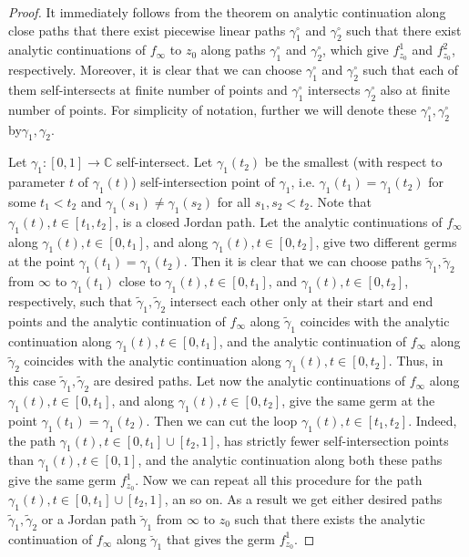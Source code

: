 \documentclass[12pt]{article}
\let\myt\widetilde
\def\CC{\mathbb C}
\begin{document}
\begin{proof}
It immediately follows from the theorem on analytic continuation along close paths that there exist piecewise linear paths $\gamma^\circ_1$ and $\gamma^\circ_2$ such that
there exist analytic continuations of $f_\infty$ to $z_0$ along paths $\gamma^\circ_1$ and $\gamma^\circ_2$, which give $f_{z_0}^1$ and $f_{z_0}^2$, respectively.
Moreover, it is clear that we can choose $\gamma^\circ_1$ and $\gamma^\circ_2$  such that each of them self-intersects at finite number of points and $\gamma^\circ_1$ intersects $\gamma^\circ_2$ also at finite number of points. For simplicity of notation, further we will denote these $\gamma^\circ_1, \gamma^\circ_2$ by$\gamma_1, \gamma_2$.

Let $\gamma_1: [0,1]\to\CC$ self-intersect. Let $\gamma_1(t_2)$ be the smallest (with respect to parameter $t$ of $\gamma_1(t)$) self-intersection point of $\gamma_1$, i.e. $\gamma_1(t_1) = \gamma_1(t_2)$ for some $t_1<t_2$ and $\gamma_1(s_1) \ne \gamma_1(s_2)$ for all $s_1,s_2<t_2$.
Note that $\gamma_1(t), t\in[t_1,t_2]$, is a closed Jordan path.
Let the analytic continuations of $f_\infty$ along $\gamma_1(t), t\in[0,t_1]$, and along $\gamma_1(t), t\in[0,t_2]$, give two different germs at the point $\gamma_1(t_1)=\gamma_1(t_2)$. Then it is clear that we can choose paths $\myt\gamma_1, \myt\gamma_2$  from $\infty$ to $\gamma_1(t_1)$ close to $\gamma_1(t), t\in[0,t_1]$, and $\gamma_1(t), t\in[0,t_2]$, respectively, such that $\myt\gamma_1, \myt\gamma_2$ intersect each other only at their start and end points and the analytic continuation of $f_\infty$ along $\myt\gamma_1$ coincides with the analytic continuation along $\gamma_1(t), t\in[0,t_1]$, and the analytic continuation of $f_\infty$ along $\myt\gamma_2$ coincides with the analytic continuation along $\gamma_1(t), t\in[0,t_2]$. Thus, in this case $\myt\gamma_1, \myt\gamma_2$ are desired paths.
Let now the analytic continuations of $f_\infty$ along $\gamma_1(t), t\in[0,t_1]$, and along $\gamma_1(t), t\in[0,t_2]$, give the same germ at the point $\gamma_1(t_1)=\gamma_1(t_2)$. Then we can cut the loop $\gamma_1(t), t\in[t_1, t_2]$. Indeed, the path $\gamma_1(t), t\in[0,t_1]\cup [t_2,1]$, has strictly fewer self-intersection points than $\gamma_1(t), t\in[0,1]$, and the analytic continuation along both these paths give the same germ $f_{z_0}^1$. Now we can repeat all this procedure for the path $\gamma_1(t), t\in[0,t_1]\cup [t_2,1]$, an so on. As a result we get either desired paths $\myt\gamma_1, \myt\gamma_2$ or a Jordan path $\breve\gamma_1$ from $\infty$ to $z_0$ such that there exists the analytic continuation of $f_\infty$ along $\breve\gamma_1$ that gives the germ $f_{z_0}^1$.


\end{proof}
\end{document}
